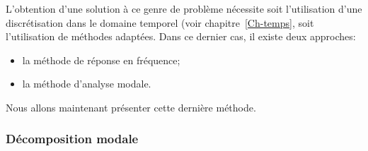 L'obtention d'une solution à ce genre de problème nécessite soit l'utilisation d'une discrétisation dans le domaine temporel (voir chapitre~\ref{Ch-temps}, soit l'utilisation de méthodes adaptées. Dans ce dernier cas, il existe deux approches:
\begin{itemize}
  \item la méthode de réponse en fréquence;
  \item la méthode d'analyse modale.
\end{itemize}
Nous allons maintenant présenter cette dernière méthode.

\medskip
\subsubsection{Décomposition modale}

